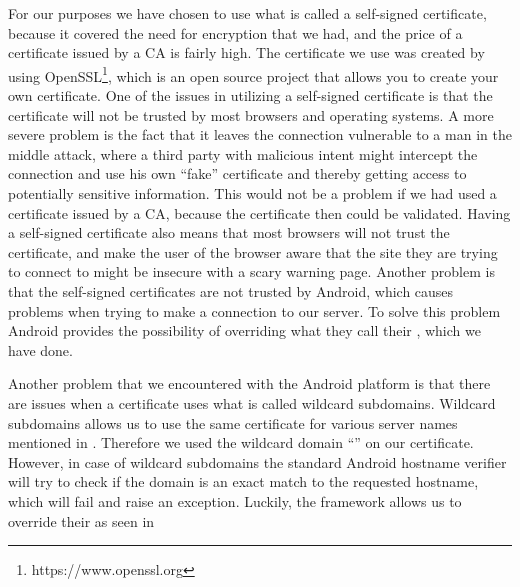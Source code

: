 For our purposes we have chosen to use what is called a self-signed certificate, because it covered the need for encryption that we had, and the price of a certificate issued by a CA is fairly high. The certificate we use was created by using OpenSSL\footnote{https://www.openssl.org}, which is an open source project that allows you to create your own certificate. One of the issues in utilizing a self-signed certificate is that the certificate will not be trusted by most browsers and operating systems. A more severe problem is the fact that it leaves the connection vulnerable to a man in the middle attack, where a third party with malicious intent might intercept the connection and use his own ``fake'' certificate and thereby getting access to potentially sensitive information. This would not be a problem if we had used a certificate issued by a CA, because the certificate then could be validated. Having a self-signed certificate also means that most browsers will not trust the certificate, and make the user of the browser aware that the site they are trying to connect to might be insecure with a scary warning page. 
Another problem is that the self-signed certificates are not trusted by Android, which causes problems when trying to make a connection to our server. To solve this problem Android provides the possibility of overriding what they call their , which we have done. 


Another problem that we encountered with the Android platform is that there are issues when a certificate uses what is called wildcard subdomains. Wildcard subdomains allows us to use the same certificate for various server names mentioned in . Therefore we used the wildcard domain ``'' on our certificate. However, in case of wildcard subdomains the standard Android hostname verifier will try to check if the domain is an exact match to the requested hostname, which will fail and raise an exception. Luckily, the framework allows us to override their  as seen in 


